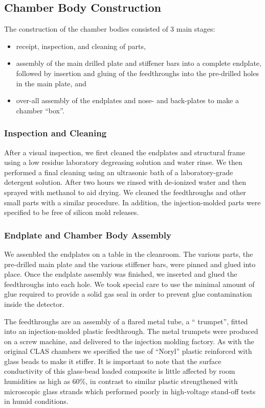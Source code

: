 \subsection{Chamber Body Construction}

The construction of the chamber bodies consisted of 3 main stages:
\begin{itemize}
\item receipt, inspection, and cleaning of parts,
\item assembly of the main drilled plate and stiffener bars into a complete endplate,
followed by insertion and gluing of the feedthroughs into the pre-drilled holes 
in the main plate, and 
\item over-all assembly of the endplates and nose- and back-plates to make
a chamber ``box''.
\end{itemize}

\subsubsection{Inspection and Cleaning}

After a visual inspection, we first cleaned the endplates and structural 
frame using a low residue laboratory degreasing solution and water rinse.
We then performed a final cleaning using an ultrasonic bath of a laboratory-grade detergent solution.  
After two hours we rinsed with de-ionized water and then sprayed 
with methanol to aid drying.
We cleaned the feedthroughs and other small parts with a similar procedure.
In addition, the injection-molded parts were specified to be free of silicon 
mold releases.
 
\subsubsection{Endplate and Chamber Body Assembly}

We assenbled the endplates on a table in the cleanroom.  The various parts,
the pre-drilled main plate and the various stiffener bars, were pinned
and glued into place.  Once the endplate assembly was finished,
we inserted and glued the feedthroughs into each hole.  We took special care 
to use the minimal amount of glue required to provide a solid gas 
seal in order to prevent glue contamination inside the detector. 

The feedthroughs are an assembly of a flared metal tube, a `` trumpet'', fitted into an injection-molded 
plastic feedthrough.  The metal trumpets were produced on a screw machine, and 
delivered to the injection molding factory.
As with the original CLAS chambers we specified the use of
``Noryl'' plastic reinforced with glass beads to make it stiffer.
It is important to note that the surface conductivity
of this glass-bead loaded composite is little affected by room humidities
as high as 60\%, in contrast to similar plastic strengthened
with microscopic glass strands which performed poorly in high-voltage stand-off
tests in humid conditions.  

